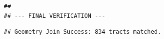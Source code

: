 \documentclass[
]{article}
\newenvironment{Shaded}{\begin{snugshade}}{\end{snugshade}}
\newcommand{\FunctionTok}[1]{\textcolor[rgb]{0.13,0.29,0.53}{\textbf{#1}}}
\newcommand{\NormalTok}[1]{#1}
\newcommand{\SpecialCharTok}[1]{\textcolor[rgb]{0.81,0.36,0.00}{\textbf{#1}}}
\newcommand{\StringTok}[1]{\textcolor[rgb]{0.31,0.60,0.02}{#1}}
\begin{document}
\begin{verbatim}
## 
## --- FINAL VERIFICATION ---
\end{verbatim}

\begin{Shaded}
\end{Shaded}

\begin{verbatim}
## Geometry Join Success: 834 tracts matched.
\end{verbatim}
\end{document}
